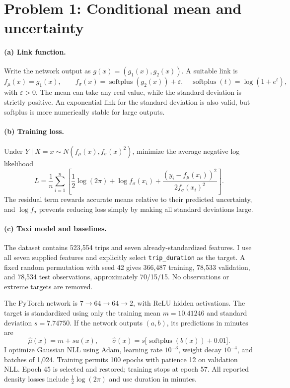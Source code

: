 \section*{Problem 1: Conditional mean and uncertainty}

\paragraph{(a) Link function.} Write the network output as $g(x)=(g_1(x),g_2(x))$. A suitable link is
\[
f_\mu(x)=g_1(x),\qquad
f_\sigma(x)=\operatorname{softplus}(g_2(x))+\varepsilon,
\quad \operatorname{softplus}(t)=\log(1+e^t),
\]
with $\varepsilon>0$. The mean can take any real value, while the standard deviation is strictly positive. An exponential link for the standard deviation is also valid, but softplus is more numerically stable for large outputs.

\paragraph{(b) Training loss.} Under $Y\mid X=x\sim N(f_\mu(x),f_\sigma(x)^2)$, minimize the average negative log likelihood
\[
L=\frac1n\sum_{i=1}^n\left[
\frac12\log(2\pi)+\log f_\sigma(x_i)
+\frac{(y_i-f_\mu(x_i))^2}{2f_\sigma(x_i)^2}
\right].
\]
The residual term rewards accurate means relative to their predicted uncertainty, and $\log f_\sigma$ prevents reducing loss simply by making all standard deviations large.

\paragraph{(c) Taxi model and baselines.} The dataset contains 523,554 trips and seven already-standardized features. I use all seven supplied features and explicitly select \texttt{trip\_duration} as the target. A fixed random permutation with seed 42 gives 366,487 training, 78,533 validation, and 78,534 test observations, approximately 70/15/15. No observations or extreme targets are removed.

The PyTorch network is $7\to64\to64\to2$, with ReLU hidden activations. The target is standardized using only the training mean $m=10.41246$ and standard deviation $s=7.74750$. If the network outputs $(a,b)$, its predictions in minutes are
\[
\widehat\mu(x)=m+sa(x),\qquad
\widehat\sigma(x)=s\big[\operatorname{softplus}(b(x))+0.01\big].
\]
I optimize Gaussian NLL using Adam, learning rate $10^{-3}$, weight decay $10^{-4}$, and batches of 1,024. Training permits 100 epochs with patience 12 on validation NLL. Epoch 45 is selected and restored; training stops at epoch 57. All reported density losses include $\tfrac12\log(2\pi)$ and use duration in minutes.


